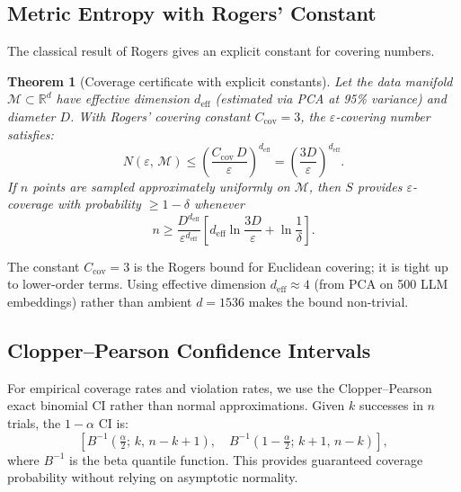 \documentclass[10pt]{article}
\newtheorem{theorem}{Theorem}
\begin{document}
\subsection{Metric Entropy with Rogers' Constant}

The classical result of Rogers gives an explicit constant for covering numbers.

\begin{theorem}[Coverage certificate with explicit constants]
\label{thm:coverage}
Let the data manifold $\mathcal{M} \subset \mathbb{R}^d$ have effective dimension $d_{\mathrm{eff}}$ (estimated via PCA at 95\% variance) and diameter $D$.
With Rogers' covering constant $C_{\mathrm{cov}} = 3$, the $\varepsilon$-covering number satisfies:
\begin{equation}
N(\varepsilon,\, \mathcal{M}) \leq \left(\frac{C_{\mathrm{cov}}\, D}{\varepsilon}\right)^{d_{\mathrm{eff}}} = \left(\frac{3D}{\varepsilon}\right)^{d_{\mathrm{eff}}}.
\label{eq:covering}
\end{equation}
If $n$ points are sampled approximately uniformly on $\mathcal{M}$, then $S$ provides $\varepsilon$-coverage with probability $\geq 1-\delta$ whenever
\begin{equation}
n \geq \frac{D^{d_{\mathrm{eff}}}}{\varepsilon^{d_{\mathrm{eff}}}} \left[d_{\mathrm{eff}} \ln\frac{3D}{\varepsilon} + \ln\frac{1}{\delta}\right].
\label{eq:sample-complexity}
\end{equation}
\end{theorem}

The constant $C_{\mathrm{cov}} = 3$ is the Rogers bound for Euclidean covering; it is tight up to lower-order terms.
Using effective dimension $d_{\mathrm{eff}} \approx 4$ (from PCA on 500 LLM embeddings) rather than ambient $d = 1536$ makes the bound non-trivial.

\subsection{Clopper--Pearson Confidence Intervals}

For empirical coverage rates and violation rates, we use the Clopper--Pearson exact binomial CI rather than normal approximations.
Given $k$ successes in $n$ trials, the $1-\alpha$ CI is:
\begin{equation}
\left[B^{-1}\!\left(\tfrac{\alpha}{2};\, k,\, n-k+1\right),\quad B^{-1}\!\left(1-\tfrac{\alpha}{2};\, k+1,\, n-k\right)\right],
\end{equation}
where $B^{-1}$ is the beta quantile function.
This provides guaranteed coverage probability without relying on asymptotic normality.
\end{document}
